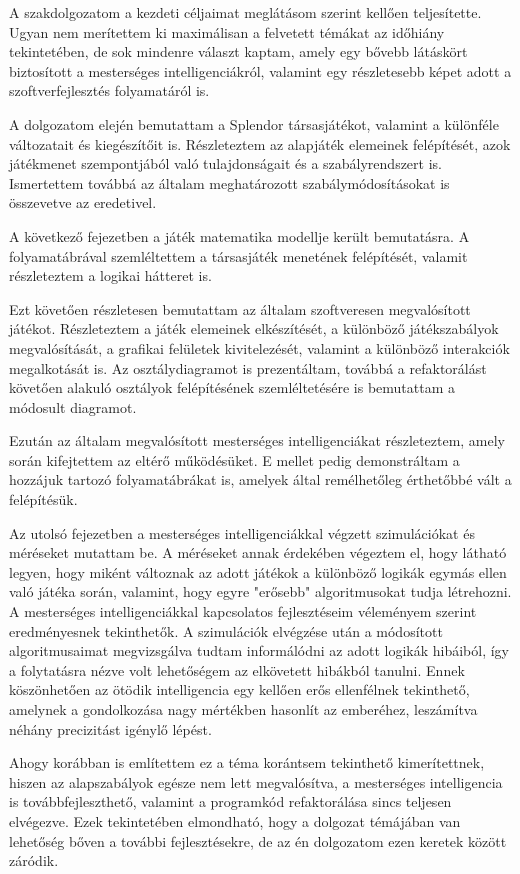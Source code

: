 
A szakdolgozatom a kezdeti céljaimat meglátásom szerint kellően teljesítette. Ugyan nem merítettem ki maximálisan a felvetett témákat az időhiány tekintetében, de sok mindenre választ kaptam, amely egy bővebb látáskört biztosított a mesterséges intelligenciákról, valamint egy részletesebb képet adott a szoftverfejlesztés folyamatáról is.

A dolgozatom elején bemutattam a Splendor társasjátékot, valamint a különféle változatait és kiegészítőit is. Részleteztem az alapjáték elemeinek felépítését, azok játékmenet szempontjából való tulajdonságait és a szabályrendszert is. Ismertettem továbbá az általam meghatározott szabálymódosításokat is összevetve az eredetivel.

A következő fejezetben a játék matematika modellje került bemutatásra. A folyamatábrával szemléltettem a társasjáték menetének felépítését, valamit részleteztem a logikai hátteret is.

Ezt követően részletesen bemutattam az általam szoftveresen megvalósított játékot. Részleteztem a játék elemeinek elkészítését, a különböző játékszabályok megvalósítását, a grafikai felületek kivitelezését, valamint a különböző interakciók megalkotását is. Az osztálydiagramot is prezentáltam, továbbá a refaktorálást követően alakuló osztályok felépítésének szemléltetésére is bemutattam a módosult diagramot.

Ezután az általam megvalósított mesterséges intelligenciákat részleteztem, amely során kifejtettem az eltérő működésüket. E mellet pedig demonstráltam a hozzájuk tartozó folyamatábrákat is, amelyek által remélhetőleg érthetőbbé vált a felépítésük.

Az utolsó fejezetben a mesterséges intelligenciákkal végzett szimulációkat és méréseket mutattam be. A méréseket annak érdekében végeztem el, hogy látható legyen, hogy miként változnak az adott játékok a különböző logikák egymás ellen való játéka során, valamint, hogy egyre "erősebb" algoritmusokat tudja létrehozni. A mesterséges intelligenciákkal kapcsolatos fejlesztéseim véleményem szerint eredményesnek tekinthetők. A szimulációk elvégzése után a módosított algoritmusaimat megvizsgálva tudtam informálódni az adott logikák hibáiból, így a folytatásra nézve volt lehetőségem az elkövetett hibákból tanulni. Ennek köszönhetően az ötödik intelligencia egy kellően erős ellenfélnek tekinthető, amelynek a gondolkozása nagy mértékben hasonlít az emberéhez, leszámítva néhány precizitást igénylő lépést.

Ahogy korábban is említettem ez a téma korántsem tekinthető kimerítettnek, hiszen az alapszabályok egésze nem lett megvalósítva, a mesterséges intelligencia is továbbfejleszthető, valamint a programkód refaktorálása sincs teljesen elvégezve. Ezek tekintetében elmondható, hogy a dolgozat témájában van lehetőség bőven a további fejlesztésekre, de az én dolgozatom ezen keretek között záródik.
